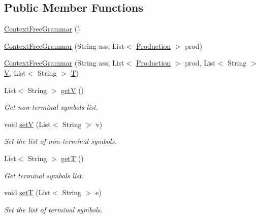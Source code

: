 \subsection*{Public Member Functions}
\begin{DoxyCompactItemize}
\item 
\hyperlink{classcontext_free_1_1grammar_1_1_context_free_grammar_ab78c5e13de642ff84db424e6fb4a5aa1}{Context\-Free\-Grammar} ()
\item 
\hyperlink{classcontext_free_1_1grammar_1_1_context_free_grammar_ad4871f790005d3582e0f4d50aceac810}{Context\-Free\-Grammar} (String ass, List$<$ \hyperlink{classcontext_free_1_1grammar_1_1_production}{Production} $>$ prod)
\item 
\hyperlink{classcontext_free_1_1grammar_1_1_context_free_grammar_aa29c85cc857ff390f50efc82d7c959e9}{Context\-Free\-Grammar} (String ass, List$<$ \hyperlink{classcontext_free_1_1grammar_1_1_production}{Production} $>$ prod, List$<$ String $>$ \hyperlink{classcontext_free_1_1grammar_1_1_context_free_grammar_a8cecf8ee3fe6ca01f58aacf390720746}{V}, List$<$ String $>$ \hyperlink{classcontext_free_1_1grammar_1_1_context_free_grammar_a5e6072d2c2f11703160c3c39c2968489}{T})
\item 
List$<$ String $>$ \hyperlink{classcontext_free_1_1grammar_1_1_context_free_grammar_a664b69a446100c7c4e7a390fb2ee5ebc}{get\-V} ()
\begin{DoxyCompactList}\small\item\em Get non-\/terminal symbols list. \end{DoxyCompactList}\item 
void \hyperlink{classcontext_free_1_1grammar_1_1_context_free_grammar_ad3d3e1efadeb4cc6ed252342fd52c76c}{set\-V} (List$<$ String $>$ v)
\begin{DoxyCompactList}\small\item\em Set the list of non-\/terminal symbols. \end{DoxyCompactList}\item 
List$<$ String $>$ \hyperlink{classcontext_free_1_1grammar_1_1_context_free_grammar_a75f1bbf1e0d1d1350032c628779fcffd}{get\-T} ()
\begin{DoxyCompactList}\small\item\em Get terminal symbols list. \end{DoxyCompactList}\item 
void \hyperlink{classcontext_free_1_1grammar_1_1_context_free_grammar_aa1c9a277d660b2ba8443f47cb9543811}{set\-T} (List$<$ String $>$ e)
\begin{DoxyCompactList}\small\item\em Set the list of terminal symbols. \end{DoxyCompactList}\item 

\end{DoxyCompactItemize}
